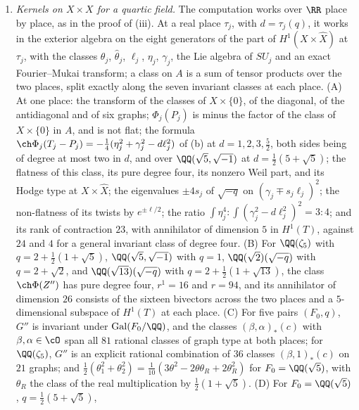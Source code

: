 \begin{enumerate}[label=\textup{(\Roman*)},leftmargin=*]
\item \emph{Kernels on $X\times X$ for a quartic field.} The computation
  works over $\RR$ place by place, as in the proof of
  (iii). At a real place $\tau_{j}$, with
  $d=\tau_{j}(q)$, it works in the exterior algebra on the eight generators
  of the part of $H^{1}(X\times\widehat X)$ at $\tau_{j}$, with the classes
  $\theta_{j}$, $\widehat\theta_{j}$, $\ell_{j}$, $\eta_{j}$, $\gamma_{j}$,
  the Lie algebra of $SU_{j}$ and an exact Fourier--Mukai transform; a class
  on $A$ is a sum of tensor products over the two places, split exactly along
  the seven invariant classes at each place. (A) At one place: the transform
  of the classes of $X\times\{0\}$, of the diagonal, of the antidiagonal and
  of six graphs; $\Phi_{j}(P_{j})$ is minus the factor of the class of
  $X\times\{0\}$ in $A$, and is not flat; the formula
  $\ch\Phi_{j}(T_{j}-P_{j})=-\frac14(\eta_{j}^{2}+\gamma_{j}^{2}-d\ell_{j}^{2})$
  of (b) at $d=1,2,3,\frac52$, both sides being
  of degree at most two in $d$, and over $\QQ(\sqrt5,\sqrt{-1})$ at
  $d=\frac12(5+\sqrt5)$; the flatness of this class, its pure degree four,
  its nonzero Weil part, and its Hodge type at $X\times\widehat X$; the
  eigenvalues $\pm4s_{j}$ of $\sqrt{-q}$ on $(\gamma_{j}\mp s_{j}\ell_{j})^{2}$;
  the non-flatness of its twists by $e^{\pm\ell/2}$; the ratio
  $\int\eta_{j}^{4}:\int(\gamma_{j}^{2}-d\ell_{j}^{2})^{2}=3:4$; and its rank
  of contraction $23$, with annihilator of dimension $5$ in $H^{1}(T)$,
  against $24$ and $4$ for a general invariant class of degree four. (B) For
  $\QQ(\zeta_{5})$ with $q=2+\frac12(1+\sqrt5)$, $\QQ(\sqrt5,\sqrt{-1})$ with
  $q=1$, $\QQ(\sqrt2)(\sqrt{-q})$ with $q=2+\sqrt2$, and
  $\QQ(\sqrt{13})(\sqrt{-q})$ with $q=2+\frac12(1+\sqrt{13})$, the class
  $\ch\Phi(Z'')$ has pure degree four, $r^{1}=16$ and $r=94$, and its
  annihilator of dimension $26$ consists of the sixteen bivectors across the
  two places and a $5$-dimensional subspace of $H^{1}(T)$ at each place. (C)
  For five pairs $(F_{0},q)$, $G''$ is invariant under
  $\mathrm{Gal}(F_{0}/\QQ)$, and the classes $(\beta,\alpha)_{*}(c)$ with
  $\beta,\alpha\in\cO$ span all $81$ rational classes of graph type at both
  places; for $\QQ(\zeta_{5})$, $G''$ is an explicit rational combination of
  $36$ classes $(\beta,1)_{*}(c)$ on $21$ graphs; and
  $\frac12(\theta_{1}^{2}+\theta_{2}^{2})
  =\frac1{10}(3\theta^{2}-2\theta\theta_{R}+2\theta_{R}^{2})$ for
  $F_{0}=\QQ(\sqrt5)$, with $\theta_{R}$ the class of the real multiplication
  by $\frac12(1+\sqrt5)$. (D) For $F_{0}=\QQ(\sqrt5)$, $q=\frac12(5+\sqrt5)$,

\end{enumerate}
